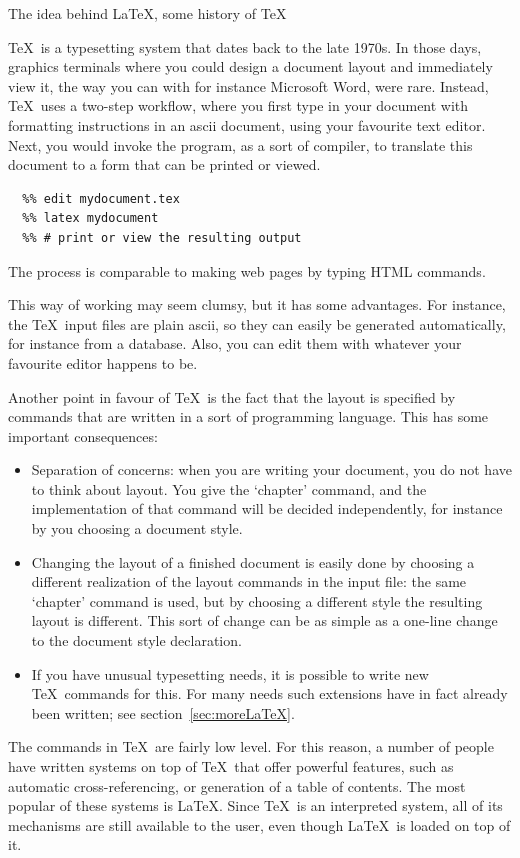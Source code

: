  {The idea behind \LaTeX, some history of \TeX}

\TeX\ is a typesetting system that dates back to the late 1970s. In
those days, graphics terminals where you could design a document layout
and immediately view it, the way you can with for instance Microsoft Word, were
rare.  Instead, \TeX\ uses a two-step workflow, where you first type
in your document with formatting instructions in an ascii document,
using your favourite text editor.
%
Next, you would invoke the
 program, as a sort of compiler, to translate this document to
a form that can be printed or viewed. 
\begin{verbatim}
  %% edit mydocument.tex
  %% latex mydocument
  %% # print or view the resulting output
\end{verbatim}
The process is comparable to
making web pages by typing HTML commands.

This way of working may seem clumsy, but
it has some advantages. For instance, the \TeX\ input files are plain
ascii, so they can easily be generated automatically, for instance
from a database. Also, you can edit them with whatever your
favourite editor happens to be.

Another point in favour of \TeX\ is the fact that the layout is
specified by commands that are written in a sort of programming
language. This has some important consequences:
\begin{itemize}
\item Separation of concerns: when you are writing your document, you
  do not have to think about layout. You give the `chapter' command,
  and the implementation of that command will be decided
  independently, for instance by you choosing a document style.
\item Changing the layout of a finished document is easily done by
  choosing a different realization of the layout commands in the input file:
  the same `chapter' command is used, but by choosing a different
  style the resulting layout is
  different. This sort of change can be as simple as 
  a one-line change to the document style declaration.
\item If you have unusual typesetting needs, it is possible to write
  new \TeX\ commands for this. For many needs such extensions have in
  fact already been written; see section~\ref{sec:moreLaTeX}.
\end{itemize}

The commands in \TeX\ are fairly low level. For this reason, a number
of people have written systems on top of \TeX\ that offer powerful
features, such as automatic cross-referencing, or generation of a
table of contents. The most popular of these systems is \LaTeX. Since
\TeX\ is an interpreted system, all of its mechanisms are still
available to the user, even though \LaTeX\ is loaded on top of it.

